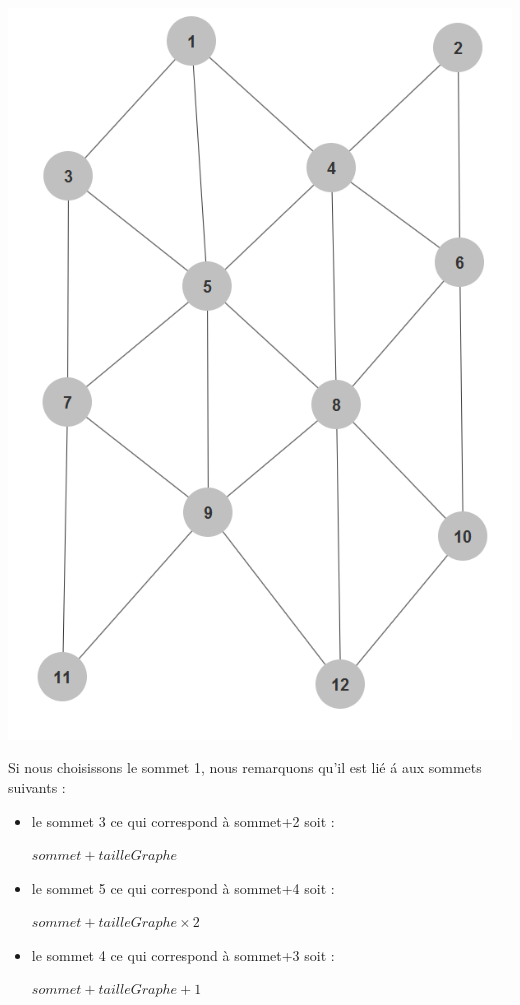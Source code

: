 \documentclass{report}
\begin{document}
			\begin{center}
				
					\includegraphics[scale=0.30]{Images/Graphe.png}
			
			\end{center}
			
			Si nous choisissons le sommet 1, nous remarquons qu'il est li\'e \'a aux sommets suivants :
			
			\begin{itemize}
			
			
				\item le sommet 3 ce qui correspond à sommet+2 soit :
				
				
			
				$sommet+tailleGraphe$
				
				\item le sommet 5 ce qui correspond à sommet+4 soit :
				
				
				
				$sommet+tailleGraphe\times2$
				
				\item le sommet 4 ce qui correspond à sommet+3 soit : 
				
				
				
				$sommet+tailleGraphe+1$
				
			\end{itemize}
			
\end{document}
